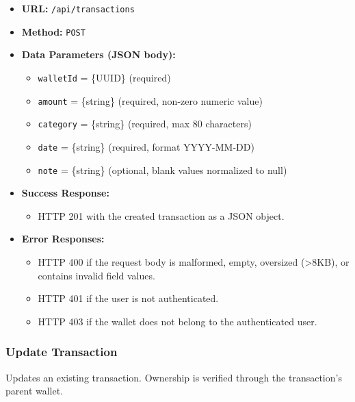 \begin{itemize}
    \item \textbf{URL:} \texttt{/api/transactions}
    \item \textbf{Method:} \texttt{POST}
    \item \textbf{Data Parameters (JSON body):}
    \begin{itemize}
        \item \texttt{walletId} = \{UUID\} (required)
        \item \texttt{amount} = \{string\} (required, non-zero numeric value)
        \item \texttt{category} = \{string\} (required, max 80 characters)
        \item \texttt{date} = \{string\} (required, format YYYY-MM-DD)
        \item \texttt{note} = \{string\} (optional, blank values normalized to null)
    \end{itemize}
    \item \textbf{Success Response:}
    \begin{itemize}
        \item HTTP 201 with the created transaction as a JSON object.
    \end{itemize}
    \item \textbf{Error Responses:}
    \begin{itemize}
        \item HTTP 400 if the request body is malformed, empty, oversized (>8KB), or contains invalid field values.
        \item HTTP 401 if the user is not authenticated.
        \item HTTP 403 if the wallet does not belong to the authenticated user.
    \end{itemize}
\end{itemize}

\subsubsection{Update Transaction}

Updates an existing transaction. Ownership is verified through the transaction's parent wallet.

